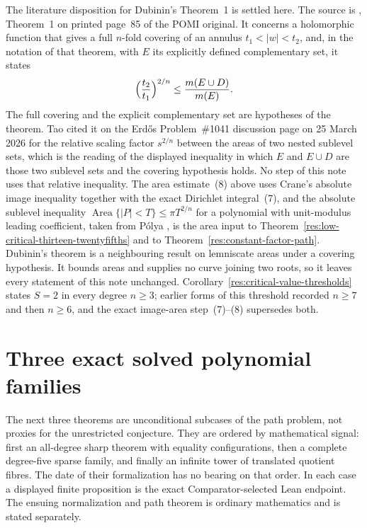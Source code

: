\documentclass[11pt]{article}
\begin{document}
The literature disposition for Dubinin's Theorem~1 is settled here.  The
source is \cite{dubinin}, Theorem~1 on printed page~85 of the POMI original.
It concerns a holomorphic function that gives a full $n$-fold covering of an
annulus $t_1<|w|<t_2$, and, in the notation of that theorem, with $E$ its
explicitly defined complementary set, it states
\[
 \Bigl(\frac{t_2}{t_1}\Bigr)^{2/n}\le\frac{m(E\cup D)}{m(E)}.
\]
The full covering and the explicit complementary set are hypotheses of the
theorem.  Tao cited it on the Erd\H{o}s Problem~\#1041 discussion page on
25 March 2026 for the relative scaling factor $s^{2/n}$ between the areas of
two nested sublevel sets, which is the reading of the displayed inequality in
which $E$ and $E\cup D$ are those two sublevel sets and the covering
hypothesis holds.  No step of this note uses that relative inequality.  The
area estimate~(8) above uses Crane's absolute image inequality together with
the exact Dirichlet integral~(7), and the absolute sublevel inequality
$\operatorname{Area}\{|P|<T\}\le\pi T^{2/n}$ for a polynomial with
unit-modulus leading coefficient, taken from P\'olya
\cite[printed pp.~280--282]{polya1928}, is the area input to
Theorem~\ref{res:low-critical-thirteen-twentyfifths} and to
Theorem~\ref{res:constant-factor-path}.  Dubinin's theorem is a
neighbouring result on lemniscate areas under a covering hypothesis.  It
bounds areas and supplies no curve joining two roots, so it leaves every
statement of this note unchanged.  Corollary~\ref{res:critical-value-thresholds}
states $S=2$ in every degree $n\ge3$; earlier forms of this threshold recorded
$n\ge7$ and then $n\ge6$, and the exact image-area step~(7)--(8) supersedes
both.

\section{Three exact solved polynomial families}
\label{sec:solved-polynomial-families}

The next three theorems are unconditional subcases of the path problem, not
proxies for the unrestricted conjecture.  They are ordered by mathematical
signal: first an all-degree sharp theorem with equality configurations, then a
complete degree-five sparse family, and finally an infinite tower of translated
quotient fibres.  The date of their formalization has no bearing on that order.
In each case a displayed finite proposition is the exact Comparator-selected
Lean endpoint.  The ensuing normalization and path theorem is ordinary
mathematics and is stated separately.
\end{document}
